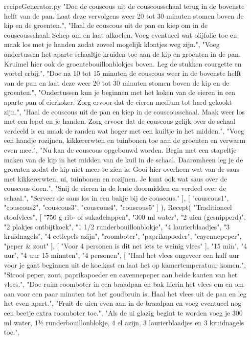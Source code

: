 \begin{filecontents*}{recipeGenerator.py}
		"Doe de couscous uit de couscousschaal terug in de bovenste helft van de pan. Laat deze vervolgens weer 20 tot 30 minuten stomen boven de kip en de groenten.",
		"Haal de couscous uit de pan en kiep om in de couscousschaal. Schep om en laat afkoelen. Voeg eventueel wat olijfolie toe en maak los met je handen zodat zoveel mogelijk klontjes weg zijn.",
		"Voeg ondertussen het aparte schaaltje kruiden toe aan de kip en groenten in de pan. Kruimel hier ook de groentebouillonblokjes boven. Leg de stukken courgette en wortel erbij.",
		"Doe na 10 tot 15 minuten de couscous weer in de bovenste helft van de pan en laat deze weer 20 tot 30 minuten stomen boven de kip en de groenten.",
		"Ondertussen kun je beginnen met het koken van de eieren in een aparte pan of eierkoker. Zorg ervoor dat de eieren medium tot hard gekookt zijn.",
		"Haal de couscous uit de pan en kiep in de couscousschaal. Maak weer los met een lepel en je handen. Zorg ervoor dat de couscous gelijk over de schaal verdeeld is en maak de randen wat hoger met een kuiltje in het midden.",
		"Voeg een handje rozijnen, kikkererwten en tuinbonen toe aan de groenten en verwarm even mee.",
		"Nu kan de couscous opgebouwd worden. Begin met een stapeltje maken van de kip in het midden van de kuil in de schaal. Daaromheen leg je de groenten zodat de kip niet meer te zien is. Gooi hier overheen wat van de saus met kikkererwten, ui, tuinbonen en rozijnen. Je kunt ook wat saus over de couscous doen.",
		"Snij de eieren in de lente doormidden en verdeel over de schaal.",
		"Serveer de saus los in een bakje bij de couscous."
	],
	[
		"couscous1",
		"couscous2",
		"couscous3",
		"couscous4",
		"couscous5"
	]
),
Recept(
	"Traditioneel stoofvlees",
	[
		"750 g rib- of sukadelappen",
		"300 ml water",
		"2 uien (gesnipperd)",
		"2 plakjes ontbijtkoek",
		"1 1/2 runderbouillonblokje",
		"4 laurierblaadjes",
		"3 kruidnagels",
		"4 eetlepels azijn",
		"roomboter",
		"paprikapoeder",
		"cayennepeper",
		"peper \& zout"
	],
	[
		"Voor 4 personen is dit net iets te weinig vlees"
	],
	"15 min",
	"4 uur",
	"4 uur 15 minuten",
	"4 personen",
	[
		"Haal het vlees ongeveer een half uur voor je gaat beginnen uit de koelkast en laat het op kamertemperatuur komen.",
		"Strooi peper, zout, paprikapoeder en cayennepeper aan beide kanten van het vlees.",
		"Doe ruim roomboter in een braadpan en bak hierin het vlees om en om aan voor een paar minuten tot het goudbruin is. Haal het vlees uit de pan en leg het even apart.",
		"Fruit de uien even aan in de braadpan en voeg eventueel nog een beetje extra roomboter toe.",
		"Als de ui glazig begint te worden voeg je 300 ml water, 1½ runderbouillonblokje, 4 el azijn, 3 laurierblaadjes en 3 kruidnagels toe.",

\end{filecontents*}
